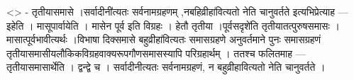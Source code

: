 \textless{}\textgreater{} - तृतीयासमासे ।सर्वादीनी॑त्यतः सर्वनामग्रहणम्
,नबहिव्रीहा॑वित्यतो नेति चानुवर्तते इत्यभिप्रेत्याह --- इहेति ।
मासूपार्वायेति । मासेन पूर्व इति विग्रहः । हेतौ तृतीया ।पूर्वसदृशे॑ति
तृतीयातत्पुरुषसमासः । मासात्पूर्वभावीत्यर्थः ।विभाषा दिक्समासे
बहुव्रीहा॑वित्यतः समासग्रहणे अनुवर्तमाने पुनः समासग्रहणं
तृतीयासमासीयलौकिकविग्रहवाक्यरूपगौणसमासस्यापि परिग्रहार्थम् । ततश्च
फलितमाह --- तृतीयासमासार्थेति । द्वन्द्वे च । सर्वादीनीत्यतः
सर्वनामग्रहणं, न बहुव्रीहावित्यतो नेति चानुवर्तते ।

